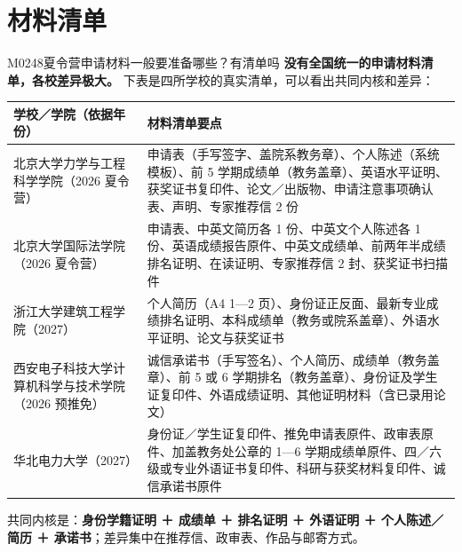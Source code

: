 \section{材料清单}
\begin{qa}{M0248}{夏令营申请材料一般要准备哪些？有清单吗}
\textbf{没有全国统一的申请材料清单，各校差异极大。} 下表是四所学校的真实清单，可以看出共同内核和差异：

\par\vspace{2pt}\nobreak\begin{center}\footnotesize
\begin{tabularx}{\textwidth}{>{\raggedright\arraybackslash}X>{\raggedright\arraybackslash}X}
\toprule
\textbf{学校／学院（依据年份）} & \textbf{材料清单要点} \\ \midrule
北京大学力学与工程科学学院（2026 夏令营） & 申请表（手写签字、盖院系教务章）、个人陈述（系统模板）、前 5 学期成绩单（教务盖章）、英语水平证明、获奖证书复印件、论文／出版物、申请注意事项确认表、声明、专家推荐信 2 份 \\
北京大学国际法学院（2026 夏令营） & 申请表、中英文简历各 1 份、中英文个人陈述各 1 份、英语成绩报告原件、中英文成绩单、前两年半成绩排名证明、在读证明、专家推荐信 2 封、获奖证书扫描件 \\
浙江大学建筑工程学院（2027） & 个人简历（A4 1—2 页）、身份证正反面、最新专业成绩排名证明、本科成绩单（教务或院系盖章）、外语水平证明、论文与获奖证书 \\
西安电子科技大学计算机科学与技术学院（2026 预推免） & 诚信承诺书（手写签名）、个人简历、成绩单（教务盖章）、前 5 或 6 学期排名（教务盖章）、身份证及学生证复印件、外语成绩证明、其他证明材料（含已录用论文） \\
华北电力大学（2027） & 身份证／学生证复印件、推免申请表原件、政审表原件、加盖教务处公章的 1—6 学期成绩单原件、四／六级或专业外语证书复印件、科研与获奖材料复印件、诚信承诺书原件 \\
\bottomrule
\end{tabularx}
\end{center}\vspace{2pt}\par

共同内核是：\textbf{身份学籍证明 ＋ 成绩单 ＋ 排名证明 ＋ 外语证明 ＋ 个人陈述／简历 ＋ 承诺书}；差异集中在推荐信、政审表、作品与邮寄方式。
\end{qa}

